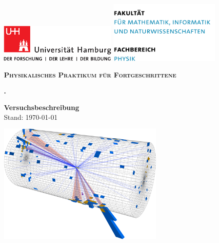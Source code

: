 \begin{vplace} %
\thispagestyle{empty}

\includegraphics[height=1.9cm]{images/UHH-Logo_2010_Farbe_CMYK}%
\hfill%
\includegraphics[height=3.1cm]{images/wortmarken}

\large
\centering
\newlength{\TitlePageSpacing}
\addtolength{\TitlePageSpacing}{.8cm}

\vspace{2\TitlePageSpacing}

\scshape
\textbf{Physikalisches Praktikum für Fortgeschrittene}\par\bigskip
 
\HUGE\normalfont
\textbf{\ExperimentID{}. \ExperimentTitle}\par

\vspace{.8\TitlePageSpacing}

\scshape

\large
\textbf{Versuchsbeschreibung} \\
Stand: \today{}\par\bigskip

\vspace{\TitlePageSpacing}
\includegraphics[height=6cm]{images/eventdisplay}
\vspace{\TitlePageSpacing}


\end{vplace}
